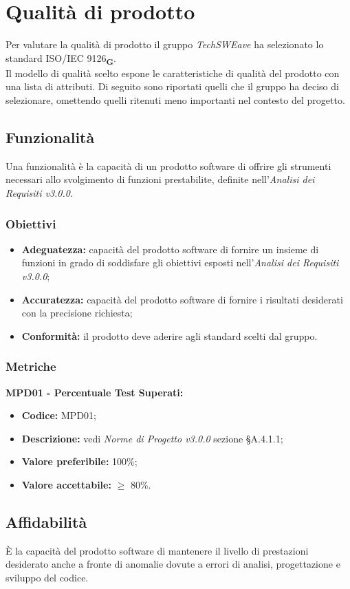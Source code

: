 \section{Qualità di prodotto}
Per valutare la qualità di prodotto il gruppo  \textit{TechSWEave} ha selezionato lo standard ISO/IEC 9126\textsubscript{\textbf{G}}.\\
Il modello di qualità scelto espone le caratteristiche di qualità del prodotto con una lista di attributi. Di seguito sono riportati quelli che il
gruppo ha deciso di selezionare, omettendo quelli ritenuti meno importanti nel contesto del progetto.
\subsection{Funzionalità}
Una funzionalità è la capacità di un prodotto software di offrire gli strumenti necessari allo svolgimento di funzioni prestabilite, definite
nell'\textit{Analisi dei Requisiti v3.0.0.}
\subsubsection{Obiettivi}
\begin{itemize}
    \item \textbf{Adeguatezza:} capacità del prodotto software di fornire un insieme di funzioni in grado
          di soddisfare gli obiettivi esposti nell’\textit{Analisi dei Requisiti v3.0.0};
    \item \textbf{Accuratezza:} capacità del prodotto software di fornire i risultati desiderati con la precisione richiesta;
    \item \textbf{Conformità:} il prodotto deve aderire agli standard scelti dal gruppo.
\end{itemize}
\subsubsection{Metriche}
\textbf{MPD01 - Percentuale Test Superati:}
\begin{itemize}
    \item \textbf{Codice:} MPD01;
    \item \textbf{Descrizione:} vedi \textit{Norme di Progetto v3.0.0} sezione \S A.4.1.1;
    \item \textbf{Valore preferibile:} 100\%;
    \item \textbf{Valore accettabile:} $\geq$ 80\%.
\end{itemize}
\subsection{Affidabilità}
È la capacità del prodotto software di mantenere il livello di prestazioni
desiderato anche a fronte di anomalie dovute a errori di analisi, progettazione e sviluppo del codice.

